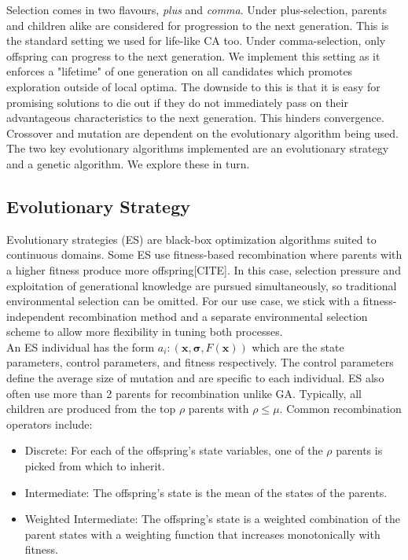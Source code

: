 Selection comes in two flavours, \textit{plus} and \textit{comma}. Under plus-selection, parents and children alike are considered for progression to the next generation. This is the standard setting we used for life-like CA too. Under comma-selection, only offspring can progress to the next generation. We implement this setting as it enforces a "lifetime" of one generation on all candidates which promotes exploration outside of local optima. The downside to this is that it is easy for promising solutions to die out if they do not immediately pass on their advantageous characteristics to the next generation. This hinders convergence.\\

Crossover and mutation are dependent on the evolutionary algorithm being used. The two key evolutionary algorithms implemented are an evolutionary strategy and a genetic algorithm. We explore these in turn.

\subsection{Evolutionary Strategy}
Evolutionary strategies (ES) are black-box optimization algorithms suited to continuous domains. Some ES use fitness-based recombination where parents with a higher fitness produce more offspring[CITE]. In this case, selection pressure and exploitation of generational knowledge are pursued simultaneously, so traditional environmental selection can be omitted. For our use case, we stick with a fitness-independent recombination method and a separate environmental selection scheme to allow more flexibility in tuning both processes.\\

An ES individual has the form $a_i: (\bm{x}, \bm{\sigma}, F(\bm{x}))$ which are the state parameters, control parameters, and fitness respectively. The control parameters define the average size of mutation and are specific to each individual. ES also often use more than 2 parents for recombination unlike GA. Typically, all children are produced from the top $\rho$ parents with $\rho \leq \mu$. Common recombination operators include:
\begin{itemize}
  \item Discrete: For each of the offspring's state variables, one of the $\rho$ parents is picked from which to inherit.
  \item Intermediate: The offspring's state is the mean of the states of the parents.
  \item Weighted Intermediate: The offspring's state is a weighted combination of the parent states with a weighting function that increases monotonically with fitness.
\end{itemize}

